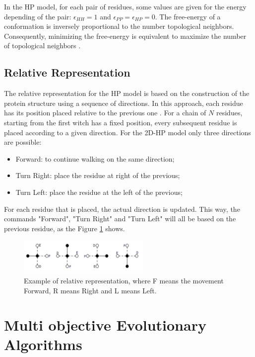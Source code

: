 \documentclass[conference]{IEEEtran}
\begin{document}
In the HP model, for each pair of residues, some values are given for the energy depending of the pair: $\epsilon_{HH}=1$ and $\epsilon_{PP} = \epsilon_{HP} = 0$. The free-energy of a conformation is inversely proportional to the number topological neighbors. Consequently, minimizing the free-energy is equivalent to maximize the number of topological neighbors \cite{lopes2008evolutionary}.


\subsection{Relative Representation}


The relative representation for the HP model is based on the construction of the protein structure using a sequence of directions. In this approach, each residue has its position placed relative to the previous one \cite{lopes2008evolutionary}. For a chain of $N$ residues, starting from the first witch has a fixed position, every subsequent residue is placed according to a given direction. For the 2D-HP model only three directions are possible: 


\begin{itemize}
	\item Forward: to continue walking on the same direction;
	\item Turn Right: place the residue at right of the previous;
	\item Turn Left: place the residue at the left of the previous;
\end{itemize}


For each residue that is placed, the actual direction is updated. This way, the commands "Forward", "Turn Right" and "Turn Left" will all be based on the previous residue, as the Figure \ref{fig2} shows.

\begin{figure}[ht]
	\centering
	\includegraphics[width=2.5in]{figures/figure2.png}
	\caption{Example of relative representation, where F means the movement Forward, R means Right and L means Left.}
	\label{fig2}
\end{figure}


\section{Multi objective Evolutionary Algorithms}
\label{sec:evol_algs}
\end{document}
